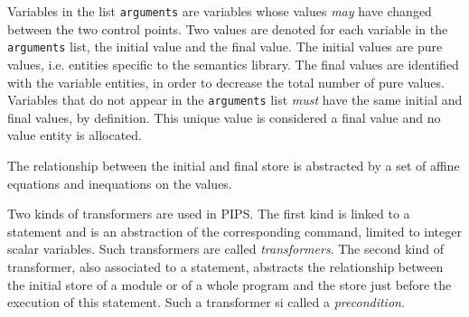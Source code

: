 \documentclass[a4paper]{article}
\begin{document}
Variables in the list \verb/arguments/ are variables whose values 
\emph{may} have changed between the two control points. Two values are denoted
for each variable in the \verb/arguments/ list, the initial value and
the final value. The initial values are pure values, i.e. entities
specific to the semantics library. The final values are identified with
the variable entities, in order to decrease the total number of pure
values. Variables that do not appear in the \verb/arguments/ list 
\emph{must} have the same initial and final values, by definition. This unique
value is considered a final value and no value entity is allocated.

\begin{comment}
Les variables qui apparaissent dans la liste des arguments sont celles
qui ont �t� modifi�es entre les deux �tats. Deux valeurs
sont donc associ�es � chacune d'entre elles: la pre- et la
post-valeur.  Les post-valeurs sont port�es par les entit�s
elles-m�mes. Les pr�-valeurs sont port�es par des entit�s
sp�ciales. Les variables scalaires enti�res qui ne sont pas modifi�es
et qui n'apparaissent donc pas dans la liste des arguments n'ont qu'une
seule valeur, port�e par l'entit� correspondant � la variable.
\end{comment}

The relationship between the initial and final store is abstracted by a
set of affine equations and inequations on the values.

\begin{comment}
La relation est d�finie par des �galit�s et des in�galit�s
lin�aires entre valeurs.
\end{comment}

Two kinds of transformers are used in PIPS. The first kind is linked to
a statement and is an abstraction of the corresponding command, limited
to integer scalar variables. Such transformers are called 
\emph{transformers}. The second kind of transformer, also associated to a
statement, abstracts the relationship between the initial store of a
module or of a whole program and the store just before the execution of
this statement. Such a transformer si called a \emph{precondition}.

\begin{comment}
Deux types de transformers sont utilis�s. Le premier est propre � un
\texttt{statement} et donne une abstraction de son effet sur les variables
enti�res. Les variables qui apparaissent dans la liste des arguments
sont celles qui sont affect�es lors de son ex�cution.  Le second,
aussi associ� � un \texttt{statement}, donne une relation entre l'�tat
initial d'un module et l'�tat pr�c�dent l'ex�cution de ce \texttt{statement}.
\end{comment}
\end{document}
